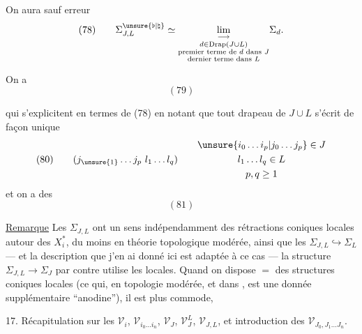 On aura sauf erreur
\[
(78)\qquad\Sigma_{J,L}^{\unsure{\flat|\natural}}\simeq
\underset{\substack{d\in\mathrm{Drap}(J\cup L)\\\text{premier terme de }d\text{ dans }J\\\text{dernier terme dans }L}}{\lim_{\longrightarrow}}\Sigma_d.
\]

On a
\[
(79)
\]

qui s'explicitent en termes de (78) en notant que tout drapeau de $J\cup L$  s'écrit de façon unique
\[
(80)\qquad(j_{\unsure{1}}\ldots j_p\ l_1\ldots l_q)\qquad
\begin{gathered}
\unsure{i_0\ldots i_p|j_0\ldots j_p}\in J\\
l_1\ldots l_q\in L\\
p,q\geq1
\end{gathered}
\]
et  on a des
\[(81)\]

\uline{Remarque} Les $\Sigma_{J,L}$ ont un sens  indépendamment des rétractions coniques locales autour des $X_i^*$, du moins en théorie topologique modérée, ainsi que les $\Sigma_{J,L}\hookrightarrow\Sigma_L$ --- et la description que j'en ai donné ici est adaptée à ce cas --- la structure $\Sigma_{J,L}\to\Sigma_J$ par contre utilise les   locales. Quand on dispose $=$ des structures coniques locales (ce qui, en topologie modérée, et dans , est une donnée supplémentaire ``anodine''), il est plus commode,

17. Récapitulation sur les $\mathcal V_i$, $\mathcal V_{i_0\ldots i_n}$, $\mathcal V_J$, $\mathcal V_J^L$, $\mathcal V_{J,L}$, et introduction des $\mathcal V_{J_0,J_1\ldots J_n}$.

